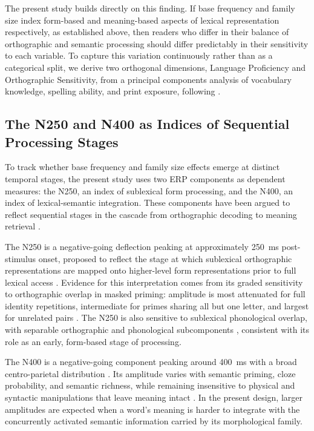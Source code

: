 \documentclass[utf8]{FrontiersinHarvard} %
\begin{document}
	The present study builds directly on this finding. If base frequency and family size index form-based and meaning-based aspects of lexical representation respectively, as established above, then readers who differ in their balance of orthographic and semantic processing should differ predictably in their sensitivity to each variable. To capture this variation continuously rather than as a categorical split, we derive two orthogonal dimensions, Language Proficiency and Orthographic Sensitivity, from a principal components analysis of vocabulary knowledge, spelling ability, and print exposure, following \citet{andrewsMorphologicalPrimingStronger2013}.

	\subsection{The N250 and N400 as Indices of Sequential Processing Stages}

	To track whether base frequency and family size effects emerge at distinct temporal stages, the present study uses two ERP components as dependent measures: the N250, an index of sublexical form processing, and the N400, an index of lexical-semantic integration. These components have been argued to reflect sequential stages in the cascade from orthographic decoding to meaning retrieval \citep{graingerWatchingWordGo2009}.

	The N250 is a negative-going deflection peaking at approximately 250~ms post-stimulus onset, proposed to reflect the stage at which sublexical orthographic representations are mapped onto higher-level form representations prior to full lexical access \citep{holcombTimeCourseVisual2006}. Evidence for this interpretation comes from its graded sensitivity to orthographic overlap in masked priming: amplitude is most attenuated for full identity repetitions, intermediate for primes sharing all but one letter, and largest for unrelated pairs \citep{holcombTimeCourseVisual2006, holcomb_exploring_2007}. The N250 is also sensitive to sublexical phonological overlap, with separable orthographic and phonological subcomponents \citep{graingerTimeCourseOrthographic2006}, consistent with its role as an early, form-based stage of processing.

	The N400 is a negative-going component peaking around 400~ms with a broad centro-parietal distribution \citep{kutasReadingSenselessSentences1980}. Its amplitude varies with semantic priming, cloze probability, and semantic richness, while remaining insensitive to physical and syntactic manipulations that leave meaning intact \citep{kutasThirtyYearsCounting2011}. In the present design, larger amplitudes are expected when a word's meaning is harder to integrate with the concurrently activated semantic information carried by its morphological family.
\end{document}
